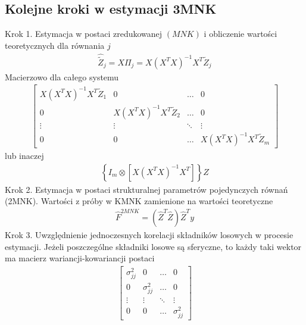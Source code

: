 \subsection{Kolejne kroki w estymacji 3MNK}
Krok 1. Estymacja w postaci zredukowanej $ (MNK) $ i obliczenie wartości teoretycznych dla równania $ j $
\begin{gather*}
\hat{ \tilde Z}_j=X\Pi_j=X\left(X^TX\right)^{-1}X^T\tilde Z_j
\end{gather*}
Macierzowo dla całego systemu
\begin{gather*}
\begin{bmatrix}
	X\left(X^TX\right)^{-1}X^T\tilde Z_1 & 0                                    & \dots  & 0                                    \\
	0                                    & X\left(X^TX\right)^{-1}X^T\tilde Z_2 & \dots  & 0                                    \\
	\vdots                               & \vdots                               & \ddots & \vdots                               \\
	0                                    & 0                                    & \dots  & X\left(X^TX\right)^{-1}X^T\tilde Z_m
\end{bmatrix}
\end{gather*}
lub inaczej
\begin{gather*}
\left\{I_m\otimes\left[X\left(X^TX\right)^{-1}X^T\right]\right\}Z
\end{gather*}
Krok 2. Estymacja w postaci strukturalnej parametrów pojedynczych równań (2MNK). Wartości z próby w KMNK zamienione na wartości teoretyczne
\begin{gather*}
\hat F^{2MNK}=\left(\hat Z^T\hat Z\right)\hat Z^Ty
\end{gather*}
Krok 3. Uwzględnienie jednoczesnych korelacji składników losowych w procesie estymacji. Jeżeli poszczególne składniki losowe są sferyczne, to każdy taki wektor ma macierz wariancji-kowariancji postaci
\begin{gather*}
\begin{bmatrix}
	\sigma _{jj}^2 & 0            & \dots & 0            \\
	0            & \sigma _{jj}^2 & \dots & 0            \\
	\vdots       & \vdots       & \ddots & \vdots       \\
	0            & 0            & \dots & \sigma _{jj}^2
\end{bmatrix}
\end{gather*}
